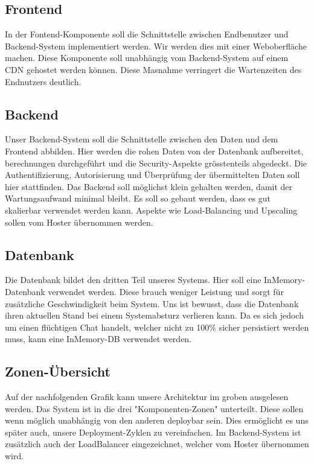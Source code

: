 	\subsection{Frontend}
	In der Fontend-Komponente soll die Schnittstelle zwischen Endbenutzer und Backend-System implementiert werden. Wir werden dies mit einer Weboberfläche machen. Diese Komponente soll unabhängig vom Backend-System auf einem CDN gehostet werden können. Diese Masnahme verringert die Wartenzeiten des Endnutzers deutlich.
	\subsection{Backend}
	Unser Backend-System soll die Schnittstelle zwischen den Daten und dem Frontend abbilden. Hier werden die rohen Daten von der Datenbank aufbereitet, berechnungen durchgeführt und die Security-Aspekte grösstenteils abgedeckt. Die Authentifizierung, Autorisierung und Überprüfung der übermittelten Daten soll hier stattfinden. Das Backend soll möglichst klein gehalten werden, damit der Wartungsaufwand minimal bleibt. Es soll so gebaut werden, dass es gut skalierbar verwendet werden kann. Aspekte wie Load-Balancing und Upscaling sollen vom Hoster übernommen werden.
	\subsection{Datenbank}
	Die Datenbank bildet den dritten Teil unseres Systems. Hier soll eine InMemory-Datenbank verwendet werden. Diese brauch weniger Leistung und sorgt für zusätzliche Geschwindigkeit beim System. Uns ist bewusst, dass die Datenbank ihren aktuellen Stand bei einem Systemabsturz verlieren kann. Da es sich jedoch um einen flüchtigen Chat handelt, welcher nicht zu 100\% sicher persistiert werden muss, kann eine InMemory-DB verwendet werden.

	\newpage

	\subsection{Zonen-Übersicht}
	Auf der nachfolgenden Grafik kann unsere Architektur im groben ausgelesen werden. Das System ist in die drei "Komponenten-Zonen" unterteilt. Diese sollen wenn möglich unabhängig von den anderen deploybar sein. Dies ermöglicht es uns später auch, unsere Deployment-Zyklen zu vereinfachen. Im Backend-System ist zusätzlich auch der LoadBalancer eingezeichnet, welcher vom Hoster übernommen wird.\newline

